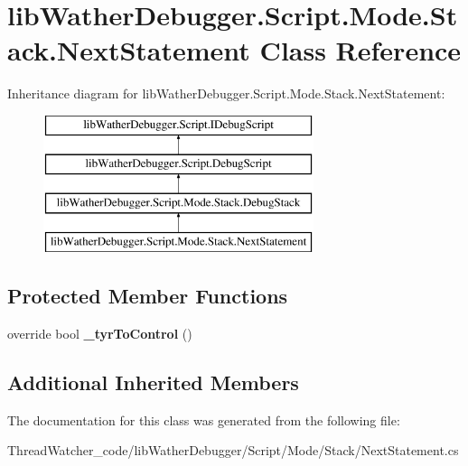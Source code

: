 \hypertarget{classlib_wather_debugger_1_1_script_1_1_mode_1_1_stack_1_1_next_statement}{\section{lib\+Wather\+Debugger.\+Script.\+Mode.\+Stack.\+Next\+Statement Class Reference}
\label{classlib_wather_debugger_1_1_script_1_1_mode_1_1_stack_1_1_next_statement}
}
Inheritance diagram for lib\+Wather\+Debugger.\+Script.\+Mode.\+Stack.\+Next\+Statement\+:\begin{figure}[H]
\begin{center}
\leavevmode
\includegraphics[height=4.000000cm]{classlib_wather_debugger_1_1_script_1_1_mode_1_1_stack_1_1_next_statement}
\end{center}
\end{figure}
\subsection*{Protected Member Functions}
\begin{DoxyCompactItemize}
\item 
\hypertarget{classlib_wather_debugger_1_1_script_1_1_mode_1_1_stack_1_1_next_statement_afee7090bedcb6444b5e816e4fecb8319}{override bool {\bfseries \+\_\+tyr\+To\+Control} ()}\label{classlib_wather_debugger_1_1_script_1_1_mode_1_1_stack_1_1_next_statement_afee7090bedcb6444b5e816e4fecb8319}

\end{DoxyCompactItemize}
\subsection*{Additional Inherited Members}


The documentation for this class was generated from the following file\+:\begin{DoxyCompactItemize}
\item 
Thread\+Watcher\+\_\+code/lib\+Wather\+Debugger/\+Script/\+Mode/\+Stack/Next\+Statement.\+cs\end{DoxyCompactItemize}
